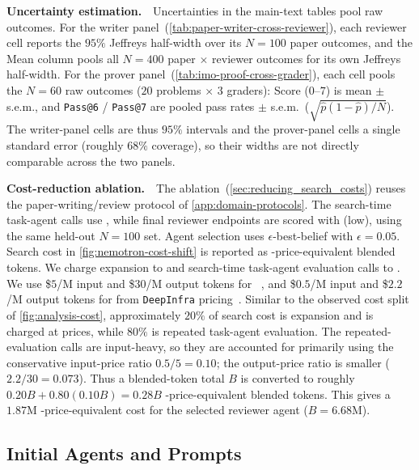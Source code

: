 \noindent\textbf{Uncertainty estimation.}~~Uncertainties in the main-text tables pool raw outcomes. For the writer panel~(\cref{tab:paper-writer-cross-reviewer}), each reviewer cell reports the $95\%$ Jeffreys half-width over its $N=100$ paper outcomes, and the Mean column pools all $N=400$ paper $\times$ reviewer outcomes for its own Jeffreys half-width. For the prover panel~(\cref{tab:imo-proof-cross-grader}), each cell pools the $N=60$ raw outcomes ($20$ problems $\times$ $3$ graders): Score ($0$--$7$) is mean $\pm$ s.e.m., and \texttt{Pass@6} / \texttt{Pass@7} are pooled pass rates $\pm$ s.e.m.\ ($\sqrt{\hat p(1-\hat p)/N}$). The writer-panel cells are thus $95\%$ intervals and the prover-panel cells a single standard error (roughly $68\%$ coverage), so their widths are not directly comparable across the two panels.

\noindent\textbf{Cost-reduction ablation.}~~The \nemotronultra ablation~(\cref{sec:reducing_search_costs}) reuses the paper-writing/review protocol of \cref{app:domain-protocols}. The search-time task-agent calls use \nemotronultra, while final \apres reviewer endpoints are scored with \gptlow (low), using the same held-out $N=100$ \apres set. Agent selection uses $\epsilon$-best-belief with $\epsilon=0.05$. Search cost in \cref{fig:nemotron-cost-shift} is reported as \gptlow-price-equivalent blended tokens. We charge expansion to \gptlow and search-time task-agent evaluation calls to \nemotronultra. We use \$$5$/M input and \$$30$/M output tokens for \gptlow~\citep{openai2026pricing}, and \$$0.5$/M input and \$$2.2$/M output tokens for \nemotronultra from \texttt{DeepInfra} pricing~\citep{deepinfra2026pricing}. Similar to the observed cost split of \cref{fig:analysis-cost}, approximately $20\%$ of search cost is expansion and is charged at \gptlow prices, while $80\%$ is repeated task-agent evaluation. The repeated-evaluation calls are input-heavy, so they are accounted for primarily using the conservative input-price ratio $0.5/5=0.10$; the output-price ratio is smaller ($2.2/30=0.073$). Thus a \nemotronultra blended-token total $B$ is converted to roughly $0.20B + 0.80(0.10B)=0.28B$ \gptlow-price-equivalent blended tokens. This gives a $1.87$M \gptlow-price-equivalent cost for the selected \nemotronultra reviewer agent ($B=6.68$M).

\subsection{Initial Agents and Prompts}
\label{app:prompts}

